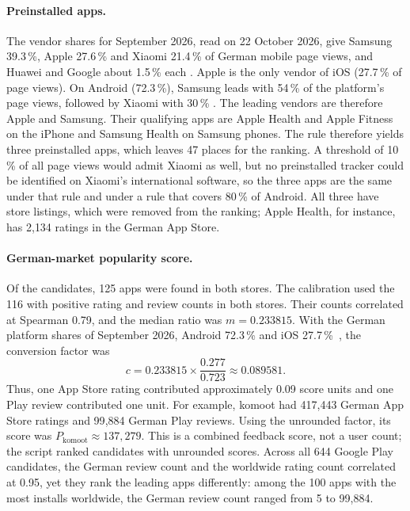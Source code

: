 \paragraph{Preinstalled apps.} The vendor shares for September 2026, read on
22 October 2026, give Samsung 39.3\,\%, Apple 27.6\,\% and Xiaomi 21.4\,\% of
German mobile page views, and Huawei and Google about 1.5\,\% each
\parencite{statcounter2026vendor}. Apple is the only vendor of iOS (27.7\,\% of
page views). On Android (72.3\,\%), Samsung leads with 54\,\% of the
platform's page views, followed by Xiaomi with 30\,\%
\parencite{statcounter2026os}. The leading vendors are therefore Apple and
Samsung. Their qualifying apps are Apple Health and Apple Fitness on the iPhone
and Samsung Health on Samsung phones. The rule therefore yields three
preinstalled apps, which leaves 47 places for the ranking. A threshold of 10\,\%
of all page views would admit Xiaomi as well, but no preinstalled tracker could
be identified on Xiaomi's international software, so the three apps are the same
under that rule and under a rule that covers 80\,\% of Android. All three have store listings, which
were removed from the ranking; Apple Health, for instance, has 2{,}134 ratings
in the German App Store.

\paragraph{German-market popularity score.} Of the candidates, 125 apps were
found in both stores. The calibration used the 116 with positive rating and
review counts in both stores. Their counts correlated at Spearman 0.79, and
the median ratio was $m = 0.233815$. With the German platform shares of
September 2026, Android 72.3\,\% and iOS
27.7\,\%~\parencite{statcounter2026os}, the conversion factor was
\[
  c = 0.233815\times\frac{0.277}{0.723}\approx 0.089581.
\]
Thus, one App Store rating contributed approximately 0.09 score units and one
Play review contributed one unit. For example, komoot had 417{,}443 German App
Store ratings and 99{,}884 German Play reviews. Using the unrounded factor,
its score was $P_{\mathrm{komoot}}\approx137{,}279$. This is a combined feedback
score, not a user count; the script ranked candidates with unrounded scores.
Across all 644 Google Play candidates, the German review count and the
worldwide rating count correlated at 0.95, yet they rank the leading apps
differently: among the 100 apps with the most installs worldwide, the German
review count ranged from 5 to 99{,}884.

